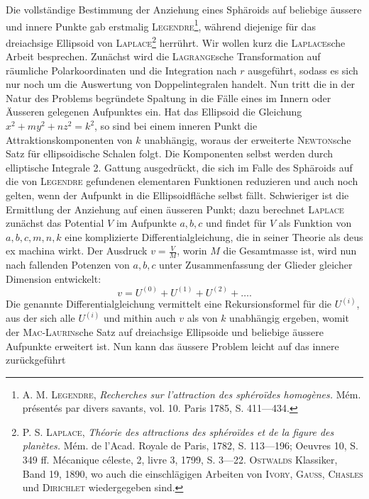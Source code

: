Die vollständige Bestimmung der Anziehung eines Sphäroids auf beliebige
äussere und innere Punkte gab erstmalig \textsc{Legendre}\footnote{\textsc{A. M. Legendre}, \textit{Recherches sur l’attraction des sphéroïdes homogènes.} Mém. présentés par divers savants, vol. 10. Paris 1785, S. 411—434.}, während diejenige für
das dreiachsige Ellipsoid von \textsc{Laplace}\footnote{\textsc{P. S. Laplace}, \textit{Théorie des attractions des sphéroïdes et de la figure des planètes.} Mém. de
l’Acad. Royale de Paris, 1782, S. 113—196; Oeuvres 10, S. 349 ff. Mécanique céleste, 2, livre 3, 1799,
S. 3—22. \textsc{Ostwalds} Klassiker, Band 19, 1890, wo auch die einschlägigen Arbeiten von \textsc{Ivory}, \textsc{Gauss},
\textsc{Chasles} und \textsc{Dirichlet} wiedergegeben sind.} herrührt.
\clearpage{}
Wir wollen kurz die \textsc{Laplace}sche Arbeit besprechen. Zunächst wird die
\textsc{Lagrange}sche Transformation auf räumliche Polarkoordinaten und die Integration
nach \(r\) ausgeführt, sodass es sich nur noch um die Auswertung von
Doppelintegralen handelt. Nun tritt die in der Natur des Problems begründete
Spaltung in die Fälle eines im Innern oder Äusseren gelegenen Aufpunktes
ein. Hat das Ellipsoid die Gleichung \(x^2+my^2+nz^2=k^2\), so sind bei
einem inneren Punkt die Attraktionskomponenten von \(k\) unabhängig, woraus
der erweiterte \textsc{Newton}sche Satz für ellipsoidische Schalen folgt. Die Komponenten
selbst werden durch elliptische Integrale 2. Gattung ausgedrückt, die
sich im Falle des Sphäroids auf die von \textsc{Legendre} gefundenen elementaren
Funktionen reduzieren und auch noch gelten, wenn der Aufpunkt in die
Ellipsoidfläche selbst fällt. Schwieriger ist die Ermittlung der Anziehung
auf einen äusseren Punkt; dazu berechnet \textsc{Laplace} zunächst das Potential \(V\)
im Aufpunkte \(a,b,c\) und findet für \(V\) als Funktion von \(a,b,c,m,n,k\) eine
komplizierte Differentialgleichung, die in seiner Theorie als deus ex machina
wirkt. Der Ausdruck \(v=\frac{V}{M}\), worin \(M\) die Gesamtmasse ist, wird nun nach
fallenden Potenzen von \(a,b,c\) unter Zusammenfassung der Glieder gleicher
Dimension entwickelt:
\[
v=U^{(0)}+U^{(1)}+U^{(2)}+\ldots.
\]
\noindent Die genannte Differentialgleichung vermittelt eine Rekursionsformel für die \(U^{(i)}\),
aus der sich alle \(U^{(i)}\) und mithin auch \(v\) als von \(k\) unabhängig ergeben, womit
der \textsc{Mac-Laurin}sche Satz auf dreiachsige Ellipsoide und beliebige äussere Aufpunkte
erweitert ist. Nun kann das äussere Problem leicht auf das innere zurückgeführt

